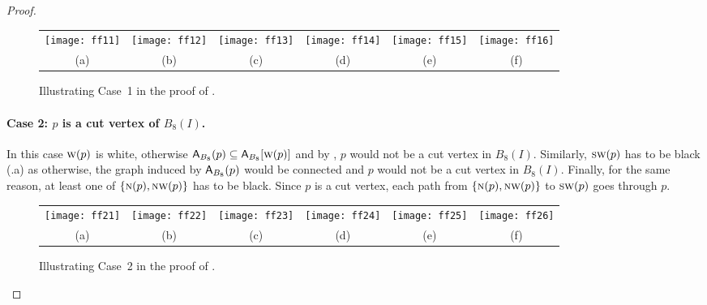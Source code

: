 \documentclass[lotsofwhite,charterfonts]{patmorin}
\newcommand{\N}{\textsc{n}}
\newcommand{\SW}{\textsc{sw}}
\newcommand{\W}{\textsc{w}}
\newcommand{\NW}{\textsc{nw}}
\newcommand{\A}[2]{\ensuremath{\protect\textup{\textsf{A}}_{#2}(#1)}}
\newcommand{\AC}[2]{\ensuremath{\protect\textup{\textsf{A}}_{#2}[#1]}}
\newcommand{\se}{\ensuremath{\subseteq}}
\begin{document}
\begin{proof}
\begin{figure}[htbp]
\begin{center}
\begin{tabular}{cccccc}
\texttt{[image: ff11]} & 
\texttt{[image: ff12]} & 
\texttt{[image: ff13]} & 
\texttt{[image: ff14]} & 
\texttt{[image: ff15]} &
\texttt{[image: ff16]}
\\
(a) & (b) & (c) & (d) & (e) & (f)
\end{tabular}
\end{center}
\caption{Illustrating Case~1 in the proof of .}
\end{figure}



\paragraph{Case 2: $p$ is a cut vertex of $B_8(I)$.} In this case $\W(p)$ is white, otherwise $\A{p}{B_8}\se \AC{\W(p)}{B_8}$ and by , $p$ would not be a cut vertex in $B_8(I)$. Similarly, $\SW(p)$ has to be black (.a) as otherwise, the graph induced by $\A{p}{B_8}$ would be connected and $p$ would not be a cut vertex in $B_8(I)$. Finally, for the same reason, at least one of $\{\N(p), \NW(p)\}$ has to be black. Since $p$ is a cut vertex, each path from $\{\N(p), \NW(p)\}$ to $\SW(p)$ goes through $p$.

\begin{figure}[htbp]
\begin{center}
\begin{tabular}{cccccc}
\texttt{[image: ff21]} &
\texttt{[image: ff22]} &
\texttt{[image: ff23]} &
\texttt{[image: ff24]} &
\texttt{[image: ff25]} &
 \texttt{[image: ff26]}
\\
(a) & (b) & (c) & (d) & (e)& (f)
\end{tabular}
\end{center}
\caption{Illustrating Case~2 in the proof of .}
\end{figure}



\end{proof}
\end{document}
